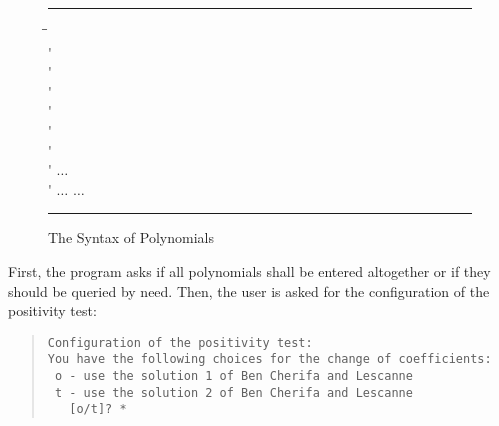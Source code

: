 \begin{figure}[htbp]
\begin{center}
\noindent
\rule{\textwidth}{0.6pt}
 
\begin{minipage}{5.9in} %
\begin{tabbing}
 \= \gprod \= \kill
\\
\>\' \gprod \>
      \gopt{\ts{+} \galt \ts{-}} 
      \\
\>\' \gprod \> 
      \\
\>\' \gprod \>  \\
\>\' \gprod \> \ts{(}  \ts{)} \galt
       \galt {} \\
\>\' \gprod \> \ts{(} \gopt{\ts{+} \galt \ts{-}}
       \ts{)}\galt {} \\
\>\' \gprod \>  \\
\>\' \gprod \>
          \galt $\ldots$ \galt {} \\
\>\' \gprod \>
          \galt $\ldots$ \galt {} \galt  
          \galt $\ldots$ \galt {} \\
\end{tabbing}
\end{minipage} 

\noindent
\rule{\textwidth}{0.6pt}
\end{center}
\caption{The Syntax of Polynomials}
\label{fi:SyntaxOfPolynomials}
\end{figure}
First, the program asks if all polynomials shall be entered altogether
or if they should be queried by need. Then, the user is asked for
the configuration of the positivity test:

\begin{quote}
\begin{verbatim}
Configuration of the positivity test:
You have the following choices for the change of coefficients: 
 o - use the solution 1 of Ben Cherifa and Lescanne
 t - use the solution 2 of Ben Cherifa and Lescanne
   [o/t]? *
\end{verbatim}
\end{quote}

